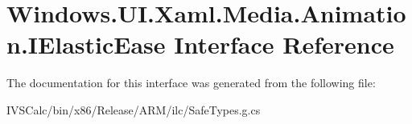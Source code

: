 \hypertarget{interface_windows_1_1_u_i_1_1_xaml_1_1_media_1_1_animation_1_1_i_elastic_ease}{}\section{Windows.\+U\+I.\+Xaml.\+Media.\+Animation.\+I\+Elastic\+Ease Interface Reference}
\label{interface_windows_1_1_u_i_1_1_xaml_1_1_media_1_1_animation_1_1_i_elastic_ease}


The documentation for this interface was generated from the following file\+:\begin{DoxyCompactItemize}
\item 
I\+V\+S\+Calc/bin/x86/\+Release/\+A\+R\+M/ilc/Safe\+Types.\+g.\+cs\end{DoxyCompactItemize}

